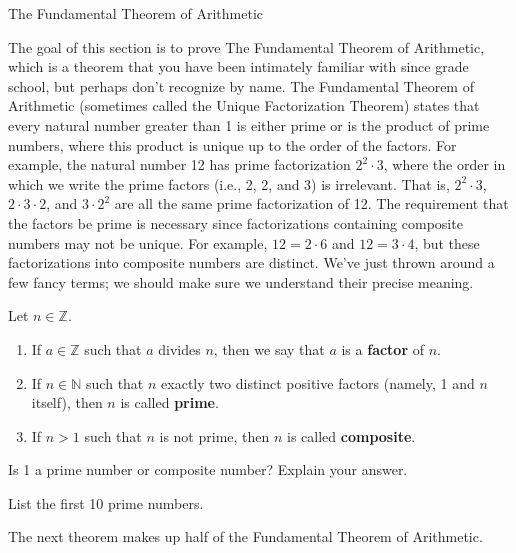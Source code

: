\begin{section}{The Fundamental Theorem of Arithmetic}

The goal of this section is to prove The Fundamental Theorem of Arithmetic, which is a theorem that you have been intimately familiar with since grade school, but perhaps don't recognize by name.  The Fundamental Theorem of Arithmetic (sometimes called the Unique Factorization Theorem) states that every natural number greater than 1 is either prime or is the product of prime numbers, where this product is unique up to the order of the factors. For example, the natural number 12 has prime factorization $2^2\cdot 3$, where the order in which we write the prime factors (i.e., 2, 2, and 3) is irrelevant. That is, $2^2\cdot 3$, $2\cdot 3\cdot2$, and $3\cdot 2^2$ are all the same prime factorization of 12. The requirement that the factors be prime is necessary since factorizations containing composite numbers may not be unique. For example, $12=2\cdot 6$ and $12=3\cdot 4$, but these factorizations into composite numbers are distinct. We've just thrown around a few fancy terms; we should make sure we understand their precise meaning.

\begin{definition}
Let $n\in\mathbb{Z}$.
\begin{enumerate}[label=\textrm{(\alph*)}]
\item If $a\in \mathbb{Z}$ such that $a$ divides $n$, then we say that $a$ is a \textbf{factor} of $n$.
\item If $n\in \mathbb{N}$ such that $n$ exactly two distinct positive factors (namely, 1 and $n$ itself), then $n$ is called \textbf{prime}.
\item If $n>1$ such that $n$ is not prime, then $n$ is called \textbf{composite}.
\end{enumerate}
\end{definition}

\begin{exercise}
Is 1 a prime number or composite number?  Explain your answer.
\end{exercise}

\begin{exercise}
List the first 10 prime numbers.
\end{exercise}

The next theorem makes up half of the Fundamental Theorem of Arithmetic.


\end{section}
